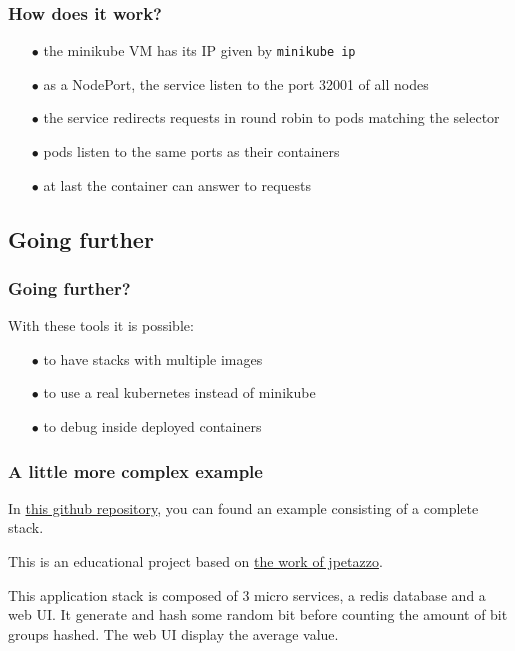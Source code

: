 	\begin{frame}[fragile]
		\frametitle{How does it work?}
		
		\begin{itemize}
			\item[$\bullet$] the minikube VM has its IP given by \verb!minikube ip!
			\item[$\bullet$] as a NodePort, the service listen to the port 32001 of all nodes
			\item[$\bullet$] the service redirects requests in round robin to pods matching the selector
			\item[$\bullet$] pods listen to the same ports as their containers
			\item[$\bullet$] at last the container can answer to requests
		\end{itemize}
	\end{frame}
	
\subsection{Going further}
	\begin{frame}
		\frametitle{Going further?}
		
		With these tools it is possible:
		\begin{itemize}
			\item[$\bullet$] to have stacks with multiple images
			\item[$\bullet$] to use a real kubernetes instead of minikube
			\item[$\bullet$] to debug inside deployed containers
		\end{itemize}
	\end{frame}
	
	\begin{frame}
		\frametitle{A little more complex example}
		
		In \href{https://github.com/Tinkou/kubercoins}{this github repository}, you can found an example consisting of a complete stack.
		
		\bigskip
		
		This is an educational project based on \href{https://github.com/jpetazzo/dockercoins}{the work of jpetazzo}.
		
		\medskip
		
		This application stack is composed of 3 micro services, a redis database and a web UI. It generate and hash some random bit before counting the amount of bit groups hashed. The web UI display the average value.
		
	\end{frame}
	
